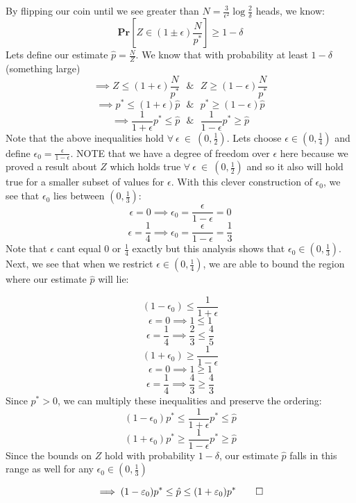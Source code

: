 \documentclass[12pt]{article}
\begin{document}
\begin{solution}
\begin{answerbox}
\begin{algorithmic}
\EndProcedure
\end{algorithmic}
\end{answerbox}
By flipping our coin until we see greater than $N = \frac{3}{\epsilon^2}\log{\frac{2}{\delta}}$ heads, we know:
\[
\textbf{Pr}[Z \in (1 \pm \epsilon)\frac{N}{p^*}] \geq 1- \delta
\]
Lets define our estimate $\hat{p} = \frac{N}{Z}$. We know that with probability at least $1-\delta$ (something large)
\[
\implies Z \leq (1 + \epsilon)\frac{N}{p^*} ~~~\&~~~ Z \geq (1 - \epsilon)\frac{N}{p^*}
\]
\[
\implies p^* \leq (1 + \epsilon)\hat{p} ~~~\&~~~ p^* \geq (1 - \epsilon)\hat{p}
\]
\[
\implies \frac{1}{1 + \epsilon}p^* \leq \hat{p} ~~~\&~~~ \frac{1}{1 - \epsilon}p^* \geq \hat{p}
\]
Note that the above inequalities hold $\forall~\epsilon~\in~(0,\frac{1}{2})$. Lets choose $\epsilon \in (0,\frac{1}{4})$ and define $\epsilon_0 = \frac{\epsilon}{1-\epsilon}$. NOTE that we have a degree of freedom over $\epsilon$ here because we proved a result about $Z$ which holds true $\forall~\epsilon~\in~(0,\frac{1}{2})$ and so it also will hold true for a smaller subset of values for $\epsilon$. With this clever construction of $\epsilon_0$, we see that $\epsilon_0$ lies between $(0,\frac{1}{3})$:
\[
\epsilon = 0 \implies \epsilon_0 = \frac{\epsilon}{1 - \epsilon} = 0
\]
\[
\epsilon = \frac{1}{4} \implies \epsilon_0 = \frac{\epsilon}{1 - \epsilon} = \frac{1}{3}
\]
Note that $\epsilon$ cant equal $0$ or $\frac{1}{4}$ exactly but this analysis shows that $\epsilon_0 \in (0,\frac{1}{3})$. Next, we see that when we restrict $\epsilon \in (0,\frac{1}{4})$, we are able to bound the region where our estimate $\hat{p}$ will lie:

\[
(1-\epsilon_0) \leq \frac{1}{1 + \epsilon}
\]
\[
\epsilon = 0 \implies 1 \leq 1
\]
\[
\epsilon = \frac{1}{4} \implies \frac{2}{3} \leq \frac{4}{5}
\]
\[
(1+\epsilon_0) \geq \frac{1}{1 - \epsilon}
\]
\[
\epsilon = 0 \implies 1 \geq 1
\]
\[
\epsilon = \frac{1}{4} \implies \frac{4}{3} \geq \frac{4}{3}
\]
Since $p^* > 0$, we can multiply these inequalities and preserve the ordering:
\[
(1-\epsilon_0)p^* \leq \frac{1}{1 + \epsilon}p^* \leq \hat{p}
\]
\[
(1+\epsilon_0)p^* \geq \frac{1}{1 - \epsilon}p^* \geq \hat{p}
\]
Since the bounds on $Z$ hold with probability $1-\delta$, our estimate $\hat{p}$ falls in this range as well for any $\epsilon_0\in (0,\frac{1}{3})$

\[
\implies (1-\epsilon_0)p^* \leq \hat{p} \leq (1+\epsilon_0)p^* \qed
\]


\end{solution}
\end{document}
